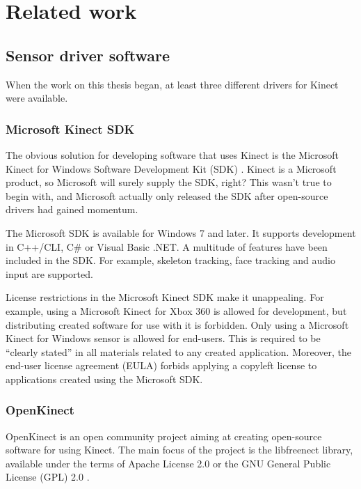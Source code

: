\chapter{Related work}


\section{Sensor driver software} \label{literature.drivers}

When the work on this thesis began, at least three different drivers for Kinect were available. 

\subsection{Microsoft Kinect SDK}

The obvious solution for developing software that uses Kinect is the Microsoft Kinect for Windows Software Development Kit (SDK) \citep{KinectSDK}. Kinect is a Microsoft product, so Microsoft will surely supply the SDK, right? This wasn't true to begin with, and Microsoft actually only released the SDK after open-source drivers had gained momentum.

The Microsoft SDK is available for Windows 7 and later. It supports development in C++/CLI, C\# or Visual Basic .NET. A multitude of features have been included in the SDK. For example, skeleton tracking, face tracking and audio input are supported.

License restrictions in the Microsoft Kinect SDK make it unappealing. For example, using a Microsoft Kinect for Xbox 360 is allowed for development, but distributing created software for use with it is forbidden. Only using a Microsoft Kinect for Windows sensor is allowed for end-users. This is required to be ``clearly stated'' in all materials related to any created application. Moreover, the end-user license agreement (EULA) forbids applying a copyleft license to applications created using the Microsoft SDK. \citep{kinectEULA}

\subsection{OpenKinect}

OpenKinect \citep{openkinect} is an open community project aiming at creating open-source software for using Kinect. The main focus of the project is the libfreenect library, available under the terms of Apache License 2.0 \citep{Apache2} or the GNU General Public License (GPL) 2.0 \citep{GPL2}.

